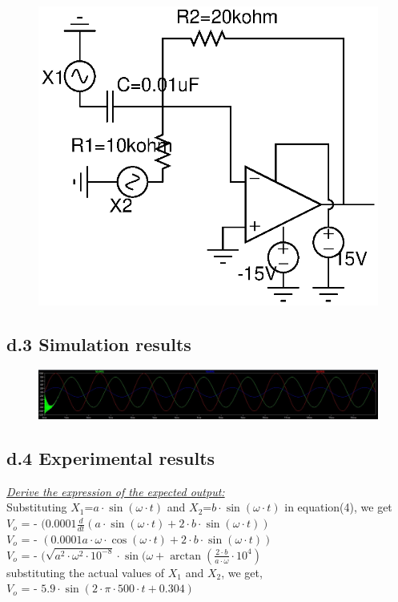 \documentclass[12pt]{article}
\begin{document}
\begin{figure}[h!]
\centering
\includegraphics[scale = 1]{Exp_1_d.eps}
\end{figure}
\newpage
\subsection*{d.3 Simulation results}%
\begin{figure}[h!]
\centering
\includegraphics[scale = 0.6]{Sim_1_d.jpg}
\end{figure}


\subsection*{d.4 Experimental results}
\underline{\textit{Derive the expression of the expected output:}}\\
Substituting $X_{1}$=$a\cdot\sin(\omega\cdot t)$ and $X_{2}$=$b\cdot\sin(\omega\cdot t)$ in equation(4), we get\\
$V_{o}$ = - $(0.0001 \frac{d}{dt}(a\cdot\sin(\omega\cdot t) + 2\cdot b\cdot\sin(\omega\cdot t))$\\
$V_{o}$ = - $(0.0001 a\cdot\omega\cdot\cos(\omega\cdot t) + 2\cdot b\cdot\sin(\omega\cdot t))$\\
$V_{o}$ = - $(\sqrt{{a^2}\cdot{\omega^2}\cdot{10^{-8}}}\cdot\sin(\omega + \arctan(\frac{2\cdot b}{a\cdot\omega}\cdot 10^4)$\\
substituting the actual values of $X_{1}$ and $X_{2}$, we get,\\
$V_{o}$ = - $5.9 \cdot \sin(2\cdot\pi\cdot500\cdot t + 0.304)$\\
\end{document}
